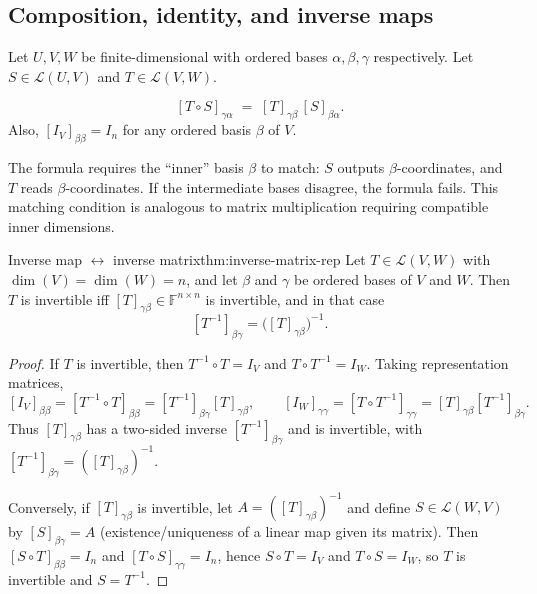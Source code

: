 \subsection{Composition, identity, and inverse maps}

Let $U,V,W$ be finite-dimensional with ordered bases $\alpha,\beta,\gamma$ respectively.
Let $S\in\mathcal{L}(U,V)$ and $T\in\mathcal{L}(V,W)$.

\begin{keyformula}[title={Key Formula: composition corresponds to multiplication}]
\[
[T\circ S]_{\gamma\alpha} \;=\; [T]_{\gamma\beta}\,[S]_{\beta\alpha}.
\]
Also, $[I_V]_{\beta\beta}=I_n$ for any ordered basis $\beta$ of $V$.
\end{keyformula}

The formula requires the ``inner'' basis $\beta$ to match: $S$ outputs $\beta$-coordinates, and $T$ reads $\beta$-coordinates.
If the intermediate bases disagree, the formula fails.
This matching condition is analogous to matrix multiplication requiring compatible inner dimensions.

\begin{theorem}{Inverse map $\leftrightarrow$ inverse matrix}{thm:inverse-matrix-rep}
Let $T\in\mathcal{L}(V,W)$ with $\dim(V)=\dim(W)=n$, and let $\beta$ and $\gamma$ be ordered bases of $V$ and $W$.
Then $T$ is invertible iff $[T]_{\gamma\beta}\in\mathbb{F}^{n\times n}$ is invertible, and in that case
\[
[T^{-1}]_{\beta\gamma}=\bigl([T]_{\gamma\beta}\bigr)^{-1}.
\]
\end{theorem}

\begin{proof}
If $T$ is invertible, then $T^{-1}\circ T=I_V$ and $T\circ T^{-1}=I_W$. Taking representation matrices,
\[
[I_V]_{\beta\beta}=[T^{-1}\circ T]_{\beta\beta}=[T^{-1}]_{\beta\gamma}[T]_{\gamma\beta},
\qquad
[I_W]_{\gamma\gamma}=[T\circ T^{-1}]_{\gamma\gamma}=[T]_{\gamma\beta}[T^{-1}]_{\beta\gamma}.
\]
Thus $[T]_{\gamma\beta}$ has a two-sided inverse $[T^{-1}]_{\beta\gamma}$ and is invertible, with
$[T^{-1}]_{\beta\gamma}=([T]_{\gamma\beta})^{-1}$.

Conversely, if $[T]_{\gamma\beta}$ is invertible, let $A=([T]_{\gamma\beta})^{-1}$ and define $S\in\mathcal{L}(W,V)$ by
$[S]_{\beta\gamma}=A$ (existence/uniqueness of a linear map given its matrix). Then $[S\circ T]_{\beta\beta}=I_n$ and
$[T\circ S]_{\gamma\gamma}=I_n$, hence $S\circ T=I_V$ and $T\circ S=I_W$, so $T$ is invertible and $S=T^{-1}$.
\end{proof}

